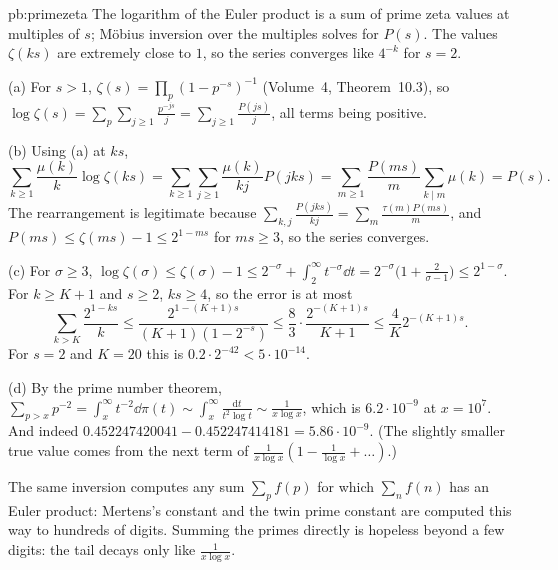 \begin{solution}{pb:primezeta}
\idea The logarithm of the Euler product is a sum of prime zeta values at multiples of $s$; Möbius inversion over the multiples solves for $P(s)$. The values $\zeta(ks)$ are
extremely close to $1$, so the series converges like $4^{-k}$ for $s=2$.

\writeup (a) For $s>1$, $\zeta(s)=\prod_p(1-p^{-s})^{-1}$ (Volume~4, Theorem~10.3), so $\log\zeta(s)=\sum_p\sum_{j\ge1}\frac{p^{-js}}j=\sum_{j\ge1}\frac{P(js)}j$, all terms being positive.

(b) Using (a) at $ks$,
\[
\sum_{k\ge1}\frac{\mu(k)}k\log\zeta(ks)=\sum_{k\ge1}\sum_{j\ge1}\frac{\mu(k)}{kj}P(jks)=\sum_{m\ge1}\frac{P(ms)}m\sum_{k\mid m}\mu(k)=P(s).
\]
The rearrangement is legitimate because $\sum_{k,j}\frac{P(jks)}{kj}=\sum_m\frac{\tau(m)P(ms)}m$, and $P(ms)\le\zeta(ms)-1\le2^{1-ms}$ for $ms\ge3$, so the series converges.

(c) For $\sigma\ge3$, $\log\zeta(\sigma)\le\zeta(\sigma)-1\le2^{-\sigma}+\int_2^\infty t^{-\sigma}\dd t=2^{-\sigma}\bigl(1+\frac2{\sigma-1}\bigr)\le2^{1-\sigma}$. For $k\ge K+1$ and $s\ge2$,
$ks\ge4$, so the error is at most
\[
\sum_{k>K}\frac{2^{1-ks}}k\le\frac{2^{1-(K+1)s}}{(K+1)(1-2^{-s})}\le\frac83\cdot\frac{2^{-(K+1)s}}{K+1}\le\frac4K2^{-(K+1)s}.
\]
For $s=2$ and $K=20$ this is $0.2\cdot2^{-42}<5\cdot10^{-14}$.

(d) By the prime number theorem, $\sum_{p>x}p^{-2}=\int_x^\infty t^{-2}\dd\pi(t)\sim\int_x^\infty\frac{\mathrm dt}{t^2\log t}\sim\frac1{x\log x}$, which is $6.2\cdot10^{-9}$ at $x=10^7$. And indeed
$0.452247420041-0.452247414181=5.86\cdot10^{-9}$. (The slightly smaller true value comes from the next term of $\frac1{x\log x}(1-\frac1{\log x}+\dots)$.)

\leads The same inversion computes any sum $\sum_pf(p)$ for which $\sum_nf(n)$ has an Euler product: Mertens's constant and the twin prime constant are computed this way to hundreds of digits.
Summing the primes directly is hopeless beyond a few digits: the tail decays only like $\frac1{x\log x}$.
\end{solution}


